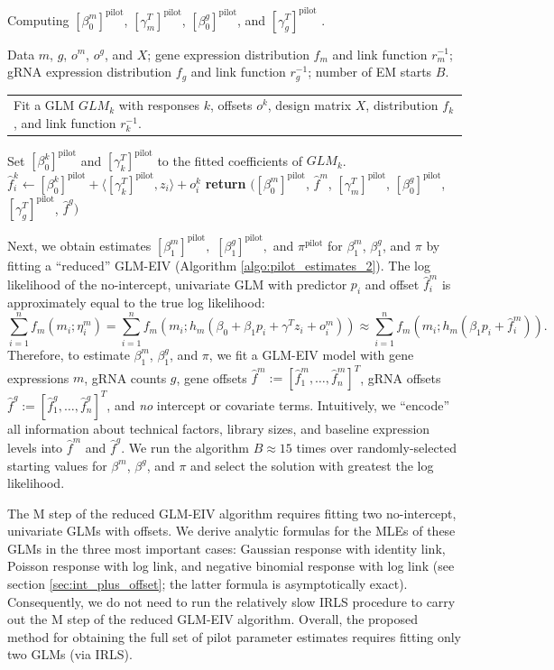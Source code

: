 \documentclass[12pt]{article}
\makeatletter
\newcommand{\multiline}[1]{%
	\begin{tabularx}{\dimexpr\linewidth-\ALG@thistlm}[t]{@{}X@{}}
		#1
	\end{tabularx}
}
\makeatother
\begin{document}
\begin{appendices}
\begin{refsection}
\begin{algorithm}
	\caption{Computing $[\beta_0^m]^\textrm{pilot}$, $[\gamma^T_m]^\textrm{pilot}$, $[\beta_0^g]^\textrm{pilot}$, and $[\gamma^T_g]^\textrm{pilot}$ .}\label{algo:pilot_estimates_1}
	\begin{algorithmic}[2]
		\Require Data $m$, $g$, $o^m$, $o^g$, and $X$; gene expression distribution $f_m$ and link function $r^{-1}_m$; gRNA expression distribution $f_g$ and link function $r^{-1}_g$; number of EM starts $B$.
		\State \multiline{Fit a GLM $GLM_k$ with responses $k$, offsets $o^k$, design matrix $X$, distribution $f_k$, and link function $r^{-1}_k$.}
		\State Set $[\beta_0^k]^\textrm{pilot}$ and $[\gamma_k^T]^\textrm{pilot}$ to the fitted coefficients of $GLM_k$.
		\State $\hat{f}^k_i \gets [\beta_0^k]^\textrm{pilot} + \langle [\gamma_k^T]^\textrm{pilot} , z_i \rangle + o_i^k$ 
		\EndFor
		\EndFor
		\State \textbf{return} $([\beta_0^m]^\textrm{pilot}$, $\hat{f}^m$, $[\gamma^T_m]^\textrm{pilot}$, $[\beta_0^g]^\textrm{pilot}$, $[\gamma^T_g]^\textrm{pilot}$, $\hat{f}^g)$
	\end{algorithmic}
\end{algorithm}

Next, we obtain estimates $[\beta_1^m]^\textrm{pilot},$ $[\beta_1^g]^\textrm{pilot},$ and $\pi^\textrm{pilot}$ for $\beta^m_1$, $\beta^g_1$, and $\pi$ by fitting a ``reduced'' GLM-EIV (Algorithm \ref{algo:pilot_estimates_2}). The log likelihood of the no-intercept, univariate GLM with predictor $p_i$ and offset $\hat{f}^m_i$ is approximately equal to the true log likelihood:
$$ \sum_{i=1}^n f_m(m_i; \eta^m_i) =
\sum_{i=1}^n f_m(m_i; h_m(\beta_0 + \beta_1 p_i + \gamma^T z_i + o^m_i)) \approx \sum_{i=1}^n f_m(m_i; h_m( \beta_1 p_i + \hat{f}^m_i)).
$$
Therefore, to estimate $\beta^m_1$, $\beta^g_1$, and $\pi$, we fit a GLM-EIV model with gene expressions $m$, gRNA counts $g$, gene offsets $\hat{f}^m := [\hat{f}^m_1, \dots, \hat{f}^m_n]^T$, gRNA offsets $\hat{f}^g := [\hat{f}^g_1, \dots, \hat{f}^g_n]^T$, and \textit{no} intercept or covariate terms. Intuitively, we ``encode'' all information about technical factors, library sizes, and baseline expression levels into $\hat{f}^m$ and $\hat{f}^g$. We run the algorithm $B \approx 15$ times over randomly-selected starting values for $\beta^m$, $\beta^g$, and $\pi$ and select the solution with greatest the log likelihood.

The M step of the reduced GLM-EIV algorithm requires fitting two no-intercept, univariate GLMs with offsets. We derive analytic formulas for the MLEs of these GLMs in the three most important cases: Gaussian response with identity link, Poisson response with log link, and negative binomial response with log link (see section \ref{sec:int_plus_offset}; the latter formula is asymptotically exact). Consequently, we do not need to run the relatively slow IRLS procedure to carry out the M step of the reduced GLM-EIV algorithm. Overall, the proposed method for obtaining the full set of pilot parameter estimates requires fitting only two GLMs (via IRLS).


\end{refsection}
\end{appendices}
\end{document}
